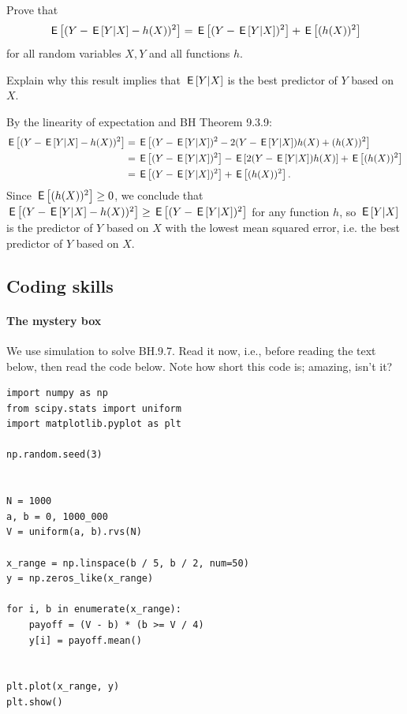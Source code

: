 \documentclass[assignments]{subfiles}
\begin{document}
\begin{exercise}
Prove that
\begin{equation}
  \label{eq:21}
\,\mathsf{E}\left[(Y - \,\mathsf{E}\left[Y|X\right] - h(X))^2\right] = \,\mathsf{E}\left[(Y - \,\mathsf{E}\left[Y|X\right])^2\right] + \,\mathsf{E}\left[(h(X))^2\right]
\end{equation}
for all random variables $X, Y$ and all functions $h$.

Explain why this result implies that  $\,\mathsf{E}\left[Y|X\right]$ is the best predictor of $Y$ based on $X$.
\begin{solution}
By the linearity of expectation and BH Theorem 9.3.9:
\begin{align*}
\,\mathsf{E}\left[(Y - \,\mathsf{E}\left[Y|X\right] - h(X))^2\right] &= \,\mathsf{E}\left[(Y - \,\mathsf{E}\left[Y|X\right])^2 - 2(Y - \,\mathsf{E}\left[Y|X\right])h(X) + (h(X))^2\right]
\\ &= \,\mathsf{E}\left[(Y - \,\mathsf{E}\left[Y|X\right])^2\right] - \,\mathsf{E}\left[2(Y - \,\mathsf{E}\left[Y|X\right])h(X)\right] + \,\mathsf{E}\left[(h(X))^2\right]
\\ &= \,\mathsf{E}\left[(Y - \,\mathsf{E}\left[Y|X\right])^2\right] + \,\mathsf{E}\left[(h(X))^2\right].
\end{align*}
Since $\,\mathsf{E}\left[(h(X))^2\right] \geq 0$, we conclude that $\,\mathsf{E}\left[(Y - \,\mathsf{E}\left[Y|X\right] - h(X))^2\right] \geq \,\mathsf{E}\left[(Y - \,\mathsf{E}\left[Y|X\right])^2\right]$ for any function $h$, so $\,\mathsf{E}\left[Y|X\right]$ is the predictor of $Y$ based on $X$ with the lowest mean squared error, i.e. the best predictor of $Y$ based on $X$.
\end{solution}
\end{exercise}


\subsection{Coding skills}

\paragraph{The mystery box}

We use  simulation to solve  BH.9.7.
Read it now, i.e., before reading the text below, then read the code below.
Note how short  this code is;  amazing, isn't it?



\begin{verbatim}
import numpy as np
from scipy.stats import uniform
import matplotlib.pyplot as plt

np.random.seed(3)


N = 1000
a, b = 0, 1000_000
V = uniform(a, b).rvs(N)

x_range = np.linspace(b / 5, b / 2, num=50)
y = np.zeros_like(x_range)

for i, b in enumerate(x_range):
    payoff = (V - b) * (b >= V / 4)
    y[i] = payoff.mean()


plt.plot(x_range, y)
plt.show()
\end{verbatim}
\end{document}
